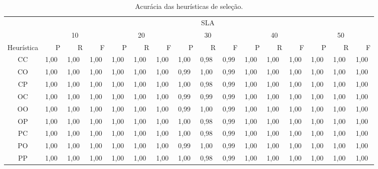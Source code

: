 \documentclass[12pt]{article}
\begin{document}
\begin{table}[t]
   \centering\scriptsize
   \caption{\label{table:acuracia_capacidade}Acurácia das heurísticas de seleção.}
    \begin{tabular}{cm{.8em}m{.8em}m{1.4em}m{.8em}m{.8em}m{1.4em}m{.8em}m{.8em}m{1.4em}m{.8em}m{.8em}m{1.4em}m{.8em}m{.8em}m{.8em}}
    \toprule
     & \multicolumn{15}{c}{SLA} \\
    \cline{2-16}
          & \multicolumn{3}{c}{10} & \multicolumn{3}{c}{20} & \multicolumn{3}{c}{30} & \multicolumn{3}{c}{40} & \multicolumn{3}{c}{50} \\
          \cline{2-16}
          \multicolumn{1}{c}{Heurística} & ~~~P     & ~~~R     & ~~~F     & ~~~P     & ~~~R     & ~~~F     & ~~~P     & ~~~R     & ~~~F     & ~~~P     & ~~~R     & ~~~F     & ~~~P     & ~~~R     & ~~~F \\
          \midrule          
    CC    & 1,00  & 1,00  & 1,00  & 1,00  & 1,00  & 1,00  & 1,00  & {\color{red}0,98}  & {\color{red}0,99}  & 1,00  & 1,00  & 1,00  & 1,00  & 1,00  & 1,00 \\
    CO    & 1,00  & 1,00  & 1,00  & 1,00  & 1,00  & 1,00  & {\color{red}0,99}  & 1,00  & {\color{red}0,99}  & 1,00  & 1,00  & 1,00  & 1,00  & 1,00  & 1,00 \\
    CP    & 1,00  & 1,00  & 1,00  & 1,00  & 1,00  & 1,00  & 1,00  & {\color{red}0,98}  & {\color{red}0,99}  & 1,00  & 1,00  & 1,00  & 1,00  & 1,00  & 1,00 \\
    OC    & 1,00  & 1,00  & 1,00  & 1,00  & 1,00  & 1,00  & {\color{red}0,99}  & {\color{red}0,99}  & {\color{red}0,99}  & 1,00  & 1,00  & 1,00  & 1,00  & 1,00  & 1,00 \\
    OO    & 1,00  & 1,00  & 1,00  & 1,00  & 1,00  & 1,00  & {\color{red}0,99}  & 1,00  & {\color{red}0,99}  & 1,00  & 1,00  & 1,00  & 1,00  & 1,00  & 1,00 \\
    OP    & 1,00  & 1,00  & 1,00  & 1,00  & 1,00  & 1,00  & 1,00  & {\color{red}0,98}  & {\color{red}0,99}  & 1,00  & 1,00  & 1,00  & 1,00  & 1,00  & 1,00 \\
    PC    & 1,00  & 1,00  & 1,00  & 1,00  & 1,00  & 1,00  & 1,00  & {\color{red}0,98}  & {\color{red}0,99}  & 1,00  & 1,00  & 1,00  & 1,00  & 1,00  & 1,00 \\
    PO    & 1,00  & 1,00  & 1,00  & 1,00  & 1,00  & 1,00  & {\color{red}0,99}  & 1,00  & {\color{red}0,99}  & 1,00  & 1,00  & 1,00  & 1,00  & 1,00  & 1,00 \\
    PP    & 1,00  & 1,00  & 1,00  & 1,00  & 1,00  & 1,00  & 1,00  & {\color{red}0,98}  & {\color{red}0,99}  & 1,00  & 1,00  & 1,00  & 1,00  & 1,00  & 1,00 \\
    \toprule
    \end{tabular}%
 \end{table}%
\end{document}
